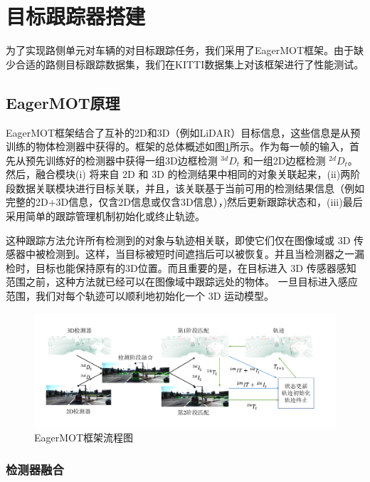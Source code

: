 \newpage
{}
\section{目标跟踪器搭建}

为了实现路侧单元对车辆的对目标跟踪任务，我们采用了EagerMOT框架。由于缺少合适的路侧目标跟踪数据集，我们在KITTI数据集上对该框架进行了性能测试。

\subsection{EagerMOT原理}

EagerMOT框架结合了互补的2D和3D（例如LiDAR）目标信息，这些信息是从预训练的物体检测器中获得的。框架的总体概述如图\ref{fig18}所示。作为每一帧的输入，首先从预先训练好的检测器中获得一组3D边框检测 $^{3d}D_t$ 和一组2D边框检测 $^{2d}D_t$。然后，融合模块(i) 将来自 2D 和 3D 的检测结果中相同的对象关联起来，(ii)两阶段数据关联模块进行目标关联，并且，该关联基于当前可用的检测结果信息（例如完整的2D+3D信息，仅含2D信息或仅含3D信息），)然后更新跟踪状态和，(iii)最后采用简单的跟踪管理机制初始化或终止轨迹。

这种跟踪方法允许所有检测到的对象与轨迹相关联，即使它们仅在图像域或 3D 传感器中被检测到。这样，当目标被短时间遮挡后可以被恢复。并且当检测器之一漏检时，目标也能保持原有的3D位置。而且重要的是，在目标进入 3D 传感器感知范围之前，这种方法就已经可以在图像域中跟踪远处的物体。 一旦目标进入感应范围，我们对每个轨迹可以顺利地初始化一个 3D 运动模型。

\begin{figure}[htb] 
    \center
    \includegraphics[width=\textwidth]{figure/fig18.png}
    \caption{EagerMOT框架流程图}
    \label{fig18}
\end{figure}

\subsubsection{检测器融合}
\label{sec3.1.1}

